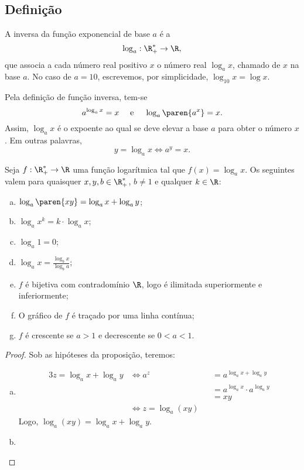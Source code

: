 \subsection{Definição}

\begin{definition}
A inversa da função exponencial de base $a$ é a 
$$\log_a : \R_+^* \to \R,$$
que associa a cada número real positivo $x$ o número real $\log_a
x$, chamado  de $x$ na base $a$. No caso de $a=10$,
escrevemos, por simplicidade, $\log_{10}x = \log x$.
\end{definition}

\begin{remark}
    Pela definição de função inversa, tem-se
$$ a^{\log_a x}=x \ \ \ \text{ e } \ \ \ \log_a \paren{a^x} = x.$$
Assim, $\log_a x $ é o expoente ao qual se deve elevar a base $a$
para obter o número $x$. Em outras palavras,
$$ y = \log_a x \iff a^y = x.$$
\end{remark}

\begin{proposition}
    Seja $f: \R_+^* \to \R$ uma função logarítmica tal que $f(x) =
\log_a x$. Os seguintes valem para quaisquer  $x, y, b \in
\R_+^*$, $b \neq 1$ e qualquer $k \in \R$:
\begin{enumerate}[(a)]
  \item $\log_a \paren{xy} = \log_a x + \log_a y$;
  \item $\log_a x^k = k\cdot \log_a x$;
  \item $\log_a 1 = 0$;
  \item $\log_a x = \frac{\log_b x}{\log_b a}$;
  \item $f$ é bijetiva com contradomínio $\R$, logo é ilimitada superiormente e inferiormente;
  \item O gráfico de $f$ é traçado por uma linha contínua;
  \item $f$ é crescente se $a>1$ e decrescente se $0<a<1$.
\end{enumerate}
\end{proposition}

\begin{proof}
    Sob as hipóteses da proposição, teremos:
    \begin{enumerate}[(a)]
        \item 
        \begin{alignat*}{3}
            z = \log_a x + \log_a y & \iff a^z && = a^{\log_a x + \log_a y}\\
            & && = a^{\log_a x} \cdot a^{\log_a y} \\
            & && = xy \\
            & \iff z = \log_a(x y) && 
        \end{alignat*}
        Logo, $\log_a(xy)=\log_a x + \log_a y$.
        \item 
    \end{enumerate}
\end{proof}

